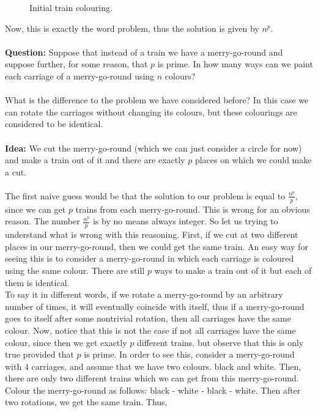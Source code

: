 \begin{figure}[ht]
    \centering
    \caption{Initial train colouring.}
    \label{fig:marrygoroundtrain}
\end{figure}

Now, this is exactly the word problem, thus the solution is given by $n^p$.
\\
\\
\noindent
\textbf{Question:} Suppose that instead of a train we have a merry-go-round and suppose further, for some reason, that $p$ is prime. 
In how many ways can we paint each carriage of a merry-go-round using $n$ colours?
\\
\\
\noindent
What is the difference to the problem we have considered before? In this case we can rotate the carriages without changing its colours, but these colourings are considered to be identical.
\\
\\
\textbf{Idea:} We cut the merry-go-round (which we can just consider a circle for now) and make a train out of it and there are exactly $p$ places on which we could make a cut.
\\
\\
The first naive guess would be that the solution to our problem is equal to $\frac{n^p}{p}$, since we can get $p$ trains from each merry-go-round. This is wrong for an obvious reason. The number $\frac{n^p}{p}$
is by no means always integer. So let us trying to understand what is wrong with this reasoning. First, if we cut at two different places in our merry-go-round, then we could get the same train. An easy way for seeing this
is to consider a merry-go-round in which each carriage is coloured using the same colour. There are still $p$ ways to make a train out of it but each of them is identical.
\\
To say it in different words, if we rotate a merry-go-round by an arbitrary number of times, it will eventually coincide with itself, thus if a merry-go-round goes to itself after some nontrivial rotation, then all carriages have the same colour.
Now, notice that this is not the case if not all carriages have the same colour, since then we get exactly $p$ different trains, but observe that this is only true provided that $p$ is prime. In order to see this, consider a merry-go-round with $4$ carriages,
and assume that we have two colours. black and white. Then, there are only two different trains which we can get from this merry-go-round. Colour the merry-go-round as follows: black - white - black - white. Then after two rotations, we get the same train. Thus, 
